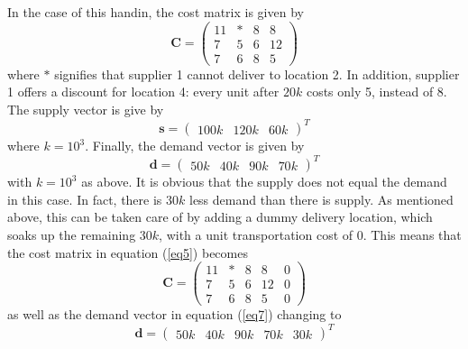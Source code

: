 \documentclass{article}
\begin{document}
  \noindent
  In the case of this handin, the cost matrix is given by
  \begin{equation}
    \mathbf{C} =
    \begin{pmatrix}
      11 & * & 8 & 8 \\
      7  & 5 & 6 & 12 \\
      7  & 6 & 8 & 5
    \end{pmatrix}
    \label{eq5}
  \end{equation}
  where $*$ signifies that supplier 1 cannot deliver to location 2. In
  addition, supplier 1 offers a discount for location 4: every unit after $20k$
  costs only 5, instead of 8.
  The supply vector is give by
  \begin{equation}
    \mathbf{s} =
    \begin{pmatrix}
      100k & 120k & 60k
    \end{pmatrix}^T
    \label{eq6}
  \end{equation}
  where $k = 10^3$. Finally, the demand vector is given by
  \begin{equation}
    \mathbf{d} =
    \begin{pmatrix}
      50k & 40k & 90k & 70k
    \end{pmatrix}^T
    \label{eq7}
  \end{equation}
  with $k = 10^3$ as above. It is obvious that the supply does not equal the
  demand in this case. In fact, there is $30k$ less demand than there is
  supply. As mentioned above, this can be taken care of by adding a dummy
  delivery location, which soaks up the remaining $30k$, with a unit
  transportation cost of $0$. This means that the cost matrix in equation
  (\ref{eq5}) becomes
  \begin{equation}
    \mathbf{C} =
    \begin{pmatrix}
      11 & * & 8 & 8  & 0\\
      7  & 5 & 6 & 12 & 0\\
      7  & 6 & 8 & 5  & 0
    \end{pmatrix}
    \label{eq8}
  \end{equation}
  as well as the demand vector in equation (\ref{eq7}) changing to
  \begin{equation}
    \mathbf{d} =
    \begin{pmatrix}
      50k & 40k & 90k & 70k & 30k
    \end{pmatrix}^T
    \label{eq9}
  \end{equation}
\end{document}
